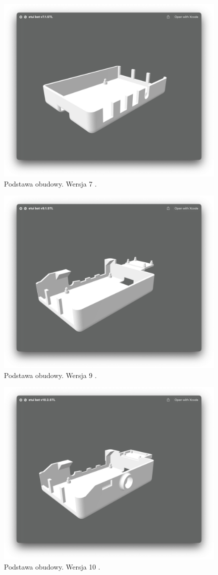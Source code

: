 \documentclass[a4paper,12pt,reqno]{article}
\begin{document}
\begin{figure}[H]%
\centering
\includegraphics[width=0.8\columnwidth]{imgs/etui_bot_v7.1.jpg}
\caption{Podstawa obudowy. Wersja 7 \cite{img_me}. \label{etui_bot_v7.1}}
\quad
\end{figure}

\begin{figure}[H]%
\centering
\includegraphics[width=0.8\columnwidth]{imgs/etui_bot_v9.1.jpg}
\caption{Podstawa obudowy. Wersja 9 \cite{img_me}. \label{etui_bot_v9.1}}
\quad
\end{figure}

\begin{figure}[H]%
\centering
\includegraphics[width=0.8\columnwidth]{imgs/etui_bot_v10.2.jpg}
\caption{Podstawa obudowy. Wersja 10 \cite{img_me}. \label{etui_bot_v10.2}}
\quad
\end{figure}
\end{document}

